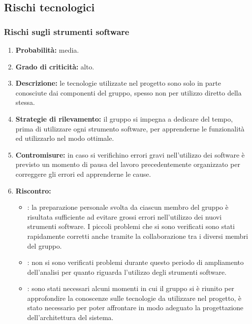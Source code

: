 \subsection{Rischi tecnologici}
\subsubsection{Rischi sugli strumenti software}
\begin{enumerate}
	\item \textbf{Probabilità:} media.
	\item \textbf{Grado di criticità:} alto.
	\item \textbf{Descrizione:} le tecnologie utilizzate nel progetto sono solo in parte conosciute dai componenti del gruppo, spesso non per utilizzo diretto della stessa.
	\item \textbf{Strategie di rilevamento:} il gruppo si impegna a dedicare del tempo, prima di utilizzare ogni strumento software, per apprenderne le funzionalità ed utilizzarlo nel modo ottimale.
	\item \textbf{Contromisure:} in caso si verifichino errori gravi nell'utilizzo dei software è previsto un momento di pausa del lavoro precedentemente organizzato per correggere gli errori ed apprenderne le cause.
	\item \textbf{Riscontro:} 
	\begin{itemize}
		\item \AR: la preparazione personale svolta da ciascun membro del gruppo è risultata sufficiente ad evitare grossi errori nell'utilizzo dei nuovi strumenti software. I piccoli problemi che si sono verificati sono stati rapidamente corretti anche tramite la collaborazione tra i diversi membri del gruppo.
		\item \AD: non si sono verificati problemi durante questo periodo di ampliamento dell'analisi per quanto riguarda l’utilizzo degli strumenti software.
		\item \PA: sono stati necessari alcuni momenti in cui il gruppo si è riunito per approfondire la conoscenze sulle tecnologie da utilizzare nel progetto, è stato necessario per poter affrontare in modo adeguato la progettazione dell'architettura del sistema.
	\end{itemize}
\end{enumerate}

